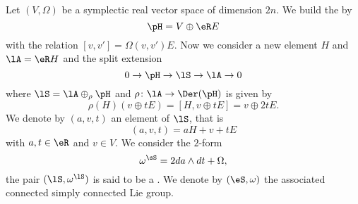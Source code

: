 Let $(V,\Omega)$ be a symplectic real vector space of dimension $2n$. We build the  by
\begin{equation}
	\pH=V\oplus \eR E
\end{equation}
with the relation $[v,v']=\Omega(v,v')E$. Now we consider a new element $H$ and $\lA=\eR H$ and the split extension
\begin{equation}
	0\to\pH\to\lS\to\lA\to 0
\end{equation}
where $\lS=\lA\oplus_{\rho}\pH$ and $\rho\colon \lA\to \Der(\pH)$ is given by
\begin{equation}
	\rho(H)(v\oplus tE)=[H,v\oplus tE]=v\oplus 2tE.
\end{equation}
We denote by $(a,v,t)$ an element of $\lS$, that is
\begin{equation}
	(a,v,t)=aH+ v+tE
\end{equation}
with $a,t\in\eR$ and $v\in V$. We consider the $2$-form
\begin{equation}
	\omega^{\sS}=2da\wedge dt+\Omega,
\end{equation}
the pair $(\lS,\omega^{\lS})$ is said to be a . We denote by $(\eS,\omega)$ the associated connected simply connected Lie group.

